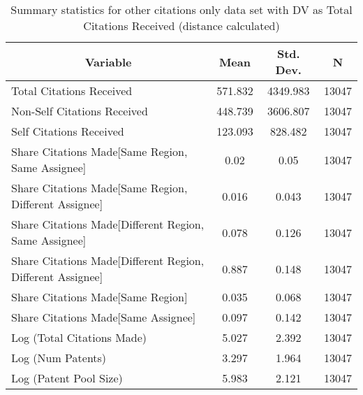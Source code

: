 
\begin{table}[htbp]\centering \caption{Summary statistics for other citations only data set with DV as Total Citations Received (distance calculated) \label{o.tsummary}}
\scriptsize
\singlespacing
\begin{tabular}{l c c  c}\hline\hline
\multicolumn{1}{c}{\textbf{Variable}} & \textbf{Mean}
 & \textbf{Std. Dev.} & \textbf{N}\\ \hline
Total Citations Received & 571.832 & 4349.983  & 13047\\
Non-Self Citations Received & 448.739 & 3606.807  & 13047\\
Self Citations Received & 123.093 & 828.482  & 13047\\
Share Citations Made[Same Region, Same Assignee] & 0.02 & 0.05  & 13047\\
Share Citations Made[Same Region, Different Assignee] & 0.016 & 0.043  & 13047\\
Share Citations Made[Different Region, Same Assignee] & 0.078 & 0.126  & 13047\\
Share Citations Made[Different Region, Different Assignee] & 0.887 & 0.148  & 13047\\
Share Citations Made[Same Region] & 0.035 & 0.068  & 13047\\
Share Citations Made[Same Assignee] & 0.097 & 0.142  & 13047\\
Log (Total Citations Made) & 5.027 & 2.392  & 13047\\
Log (Num Patents) & 3.297 & 1.964  & 13047\\
Log (Patent Pool Size) & 5.983 & 2.121  & 13047\\
\hline\end{tabular}
\end{table}

